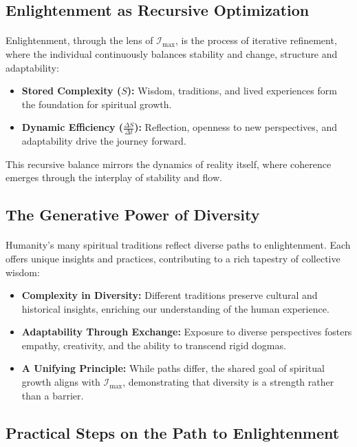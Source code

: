 \documentclass[12pt]{article}
\begin{document}
\subsection{Enlightenment as Recursive Optimization}
\paragraph{}
Enlightenment, through the lens of \(\mathcal{I}_{\text{max}}\), is the process of iterative refinement, where the individual continuously balances stability and change, structure and adaptability:
\begin{itemize}
    \item \textbf{Stored Complexity (\(S\)):} Wisdom, traditions, and lived experiences form the foundation for spiritual growth.
    \item \textbf{Dynamic Efficiency (\(\frac{\Delta S}{\Delta t}\)):} Reflection, openness to new perspectives, and adaptability drive the journey forward.
\end{itemize}
This recursive balance mirrors the dynamics of reality itself, where coherence emerges through the interplay of stability and flow.

\subsection{The Generative Power of Diversity}
\paragraph{}
Humanity’s many spiritual traditions reflect diverse paths to enlightenment. Each offers unique insights and practices, contributing to a rich tapestry of collective wisdom:
\begin{itemize}
    \item \textbf{Complexity in Diversity:} Different traditions preserve cultural and historical insights, enriching our understanding of the human experience.
    \item \textbf{Adaptability Through Exchange:} Exposure to diverse perspectives fosters empathy, creativity, and the ability to transcend rigid dogmas.
    \item \textbf{A Unifying Principle:} While paths differ, the shared goal of spiritual growth aligns with \(\mathcal{I}_{\text{max}}\), demonstrating that diversity is a strength rather than a barrier.
\end{itemize}

\subsection{Practical Steps on the Path to Enlightenment}
\end{document}
